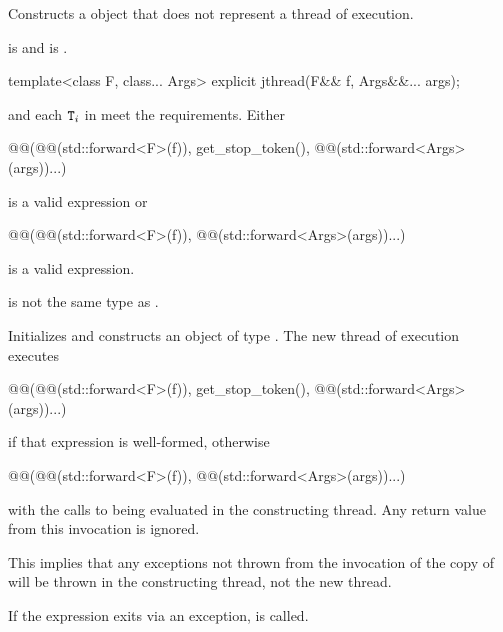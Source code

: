 \begin{itemdescr}
\pnum
\effects
Constructs a  object that does not represent
a thread of execution.

\pnum
\ensures
{} is 
and  is .
\end{itemdescr}

%
\begin{itemdecl}
template<class F, class... Args> explicit jthread(F&& f, Args&&... args);
\end{itemdecl}

\begin{itemdescr}
\pnum
\requires
{} and each $\texttt{T}_i$ in  meet the
 requirements.
Either
\begin{codeblock}
@@(@@(std::forward<F>(f)), get_stop_token(),
       @@(std::forward<Args>(args))...)
\end{codeblock}
is a valid expression or
\begin{codeblock}
@@(@@(std::forward<F>(f)), @@(std::forward<Args>(args))...)
\end{codeblock}
is a valid expression.

\pnum
\constraints
{} is not the same type as .

\pnum
\effects
Initializes  and
constructs an object of type .
The new thread of execution executes
\begin{codeblock}
@@(@@(std::forward<F>(f)), get_stop_token(),
       @@(std::forward<Args>(args))...)
\end{codeblock}
if that expression is well-formed,
otherwise
\begin{codeblock}
@@(@@(std::forward<F>(f)), @@(std::forward<Args>(args))...)
\end{codeblock}
with the calls to
 being evaluated in the constructing thread.
Any return value from this invocation is ignored.
\begin{note}
This implies that any exceptions not thrown from the invocation of the copy
of  will be thrown in the constructing thread, not the new thread.
\end{note}
If the  expression exits via an exception,
 is called.


\end{itemdescr}
